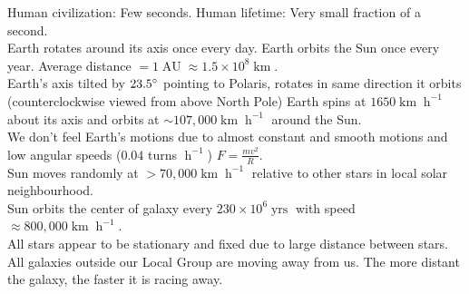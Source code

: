 \documentclass{article}
\DeclareMathOperator{\h}{h}
\DeclareMathOperator{\yrs}{yrs}
\DeclareMathOperator{\km}{km}
\DeclareMathOperator{\AU}{AU}
\begin{document}
Human civilization: Few seconds. Human lifetime: Very small fraction of a second.\\
Earth rotates around its axis once every day. Earth orbits the Sun once every year. Average distance $=1\AU\approx 1.5\times 10^{8}\km$.\\
Earth's axis tilted by $23.5\degree$ pointing to Polaris, rotates in same direction it orbits (counterclockwise viewed from above North Pole)
Earth spins at $1650\km\h^{-1}$ about its axis and orbits at $\sim 107,000\km\h^{-1}$ around the Sun.\\
We don't feel Earth's motions due to almost constant and smooth motions and low angular speeds ($0.04$ turns $\h^{-1}$) $F=\frac{mv^{2}}{R}$.\\
Sun moves randomly at $>70,000\km\h^{-1}$ relative to other stars in local solar neighbourhood.\\
Sun orbits the center of galaxy every $230\times 10^{6}\yrs$ with speed $\approx 800,000\km\h^{-1}$.\\
All stars appear to be stationary and fixed due to large distance between stars.\\
All galaxies outside our Local Group are moving away from us. The more distant the galaxy, the faster it is racing away.
\end{document}
